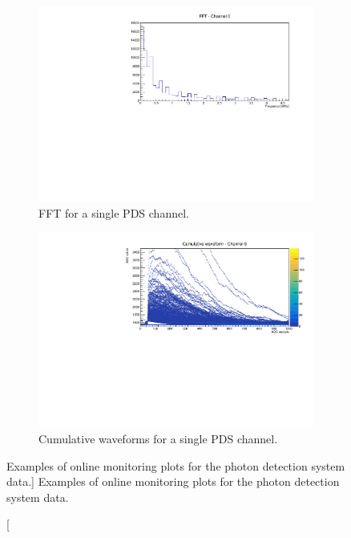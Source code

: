 \begin{figure}

	\centering

	\begin{subfigure}[b]{0.8\textwidth}
		\centering
		\vspace{3mm}
		\includegraphics[width=\textwidth]{figures/pds_fft.pdf}
		\caption {FFT for a single PDS channel.}
		\label{fig:PDS_FFT}
	\end{subfigure}

	\begin{subfigure}[b]{0.8\textwidth}
		\centering
		\vspace{3mm}
		\includegraphics[width=\textwidth]{figures/pds_wav.pdf}
		\caption {Cumulative waveforms for a single PDS channel.}
		\label{fig:PDS_wav}
	\end{subfigure}

	\caption
	[Examples of online monitoring plots for the photon detection system data.]
	{Examples of online monitoring plots for the photon detection system data.}
	\label{fig:pds_om}

\end{figure}

